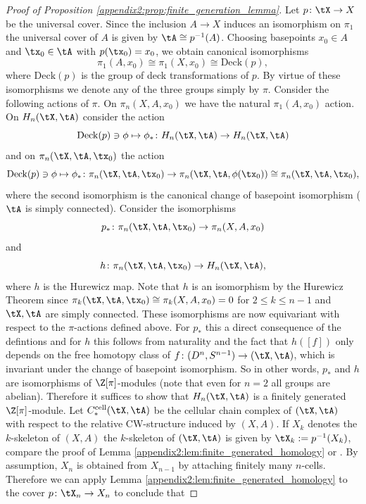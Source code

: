 \begin{proof}[Proof of Proposition \ref{appendix2:prop:finite_generation_lemma}]
    Let $p \colon \tX \to X$ be the universal cover. Since the inclusion $A \to X$ induces an isomorphism on $\pi_1$ the universal cover of $A$ is given by $\tA \cong p^{-1}(A)$. Choosing basepoints $x_0 \in A$ and $\tx_0 \in \tA$ with $p(\tx_0) = x_0$, we obtain canonical isomorphisms 
    \[
    \pi_1(A,x_0) \cong \pi_1(X,x_0) \cong \mathrm{Deck}(p),
    \]
    where $\mathrm{Deck}(p)$ is the group of deck transformations of $p$. By virtue of these isomorphisms we denote any of the three groups simply by $\pi$. Consider the following actions of $\pi$. On $\pi_n(X,A,x_0)$ we have the natural $\pi_1(A,x_0)$ action. On $H_n(\tX,\tA)$ consider the action
    \[
    \mathrm{Deck}(p) \ni \phi \mapsto \phi_\ast \colon H_n(\tX,\tA) \to H_n(\tX,\tA)
    \]
    and on $\pi_n(\tX,\tA,\tx_0)$ the action 
    \[
    \mathrm{Deck}(p) \ni \phi \mapsto \phi_\ast \colon  \pi_n(\tX,\tA,\tx_0) \to \pi_n(\tX,\tA,\phi(\tx_0)) \cong \pi_n(\tX,\tA,\tx_0),
    \]
    where the second isomorphism is the canonical change of basepoint isomorphism ($\tA$ is simply connected). Consider the isomorphisms
    \[
    p_\ast \colon \pi_n(\tX,\tA,\tx_0) \to \pi_n(X,A,x_0)
    \]
    and 
    \[
    h \colon \pi_n(\tX,\tA,\tx_0) \to H_n(\tX,\tA),
    \]
    where $h$ is the Hurewicz map. Note that $h$ is an isomorphism by the Hurewicz Theorem since $\pi_k(\tX,\tA,\tx_0) \cong \pi_k(X,A,x_0) = 0$ for $2 \leq k \leq n-1$ and $\tX, \tA$ are simply connected. These isomorphisms are now equivariant with respect to the $\pi$-actions defined above. For $p_\ast$ this a direct consequence of the defintions and for $h$ this follows from naturality and the fact that $h([f])$ only depends on the free homotopy class of $f \colon (D^n,S^{n-1}) \to (\tX,\tA)$, which is invariant under the change of basepoint isomorphism. So in other words, $p_\ast$ and $h$ are isomorphisms of $\Z[\pi]$-modules (note that even for $n=2$ all groups are abelian). Therefore it suffices to show that $H_n(\tX,\tA)$ is a finitely generated $\Z[\pi]$-module. Let $C_\ast^\mathrm{cell}(\tX,\tA)$ be the cellular chain complex of $(\tX,\tA)$ with respect to the relative CW-structure induced by $(X,A)$. If $X_k$ denotes the $k$-skeleton of $(X,A)$ the $k$-skeleton of $(\tX,\tA)$ is given by $\tX_k := p^{-1}(X_k)$, compare the proof of Lemma \ref{appendix2:lem:finite_generated_homology} or \cite[Proposition 2.3.9]{fritsch1990cellular}. By assumption, $X_n$ is obtained from $X_{n-1}$ by attaching finitely many $n$-cells. Therefore we can apply Lemma \ref{appendix2:lem:finite_generated_homology} to the cover $p \colon \tX_n \to X_n$ to conclude that 

\end{proof}
